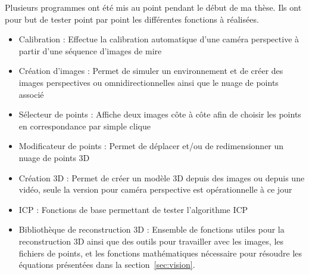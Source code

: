 Plusieurs programmes ont été mis au point pendant le début de ma thèse.
Ils ont pour but de tester point par point les différentes fonctions à réalisées.
\begin{itemize}
\item Calibration : Effectue la calibration automatique d'une caméra perspective à partir d'une séquence d'images de mire
\item Création d'images :  Permet de simuler un environnement et de créer des images perspectives ou omnidirectionnelles ainsi que le nuage de points associé
\item Sélecteur de points : Affiche deux images côte à côte afin de choisir les points en correspondance par simple clique
\item Modificateur de points : Permet de déplacer et/ou de redimensionner un nuage de points 3D
\item Création 3D : Permet de créer un modèle 3D depuis des images ou depuis une vidéo, seule la version pour caméra perspective est opérationnelle à ce jour
\item ICP : Fonctions de base permettant de tester l'algorithme ICP
\item Bibliothèque de reconstruction 3D : Ensemble de fonctions utiles pour la reconstruction 3D ainsi que des outils pour travailler avec les images, les fichiers de points, et les fonctions mathématiques nécessaire pour résoudre les équations présentées dans la section~\ref{sec:vision}.
\end{itemize}

